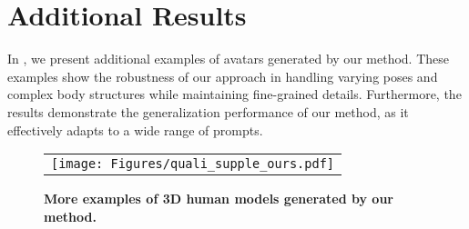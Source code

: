 \section{Additional Results}
In , we present additional examples of avatars generated by our method.
These examples show the robustness of our approach in handling varying poses and complex body structures while maintaining fine-grained details. Furthermore, the results demonstrate the generalization performance of our method, as it effectively adapts to a wide range of prompts.


\begin{figure*}[t]
\centering
\vspace*{-12\baselineskip}
\begin{tabular}{@{}c}
\texttt{[image: Figures/quali\_supple\_ours.pdf]} \\
\end{tabular}
\caption{{\bf More examples of 3D human models generated by our method.}
}
\label{fig:more_ours}
\end{figure*}
